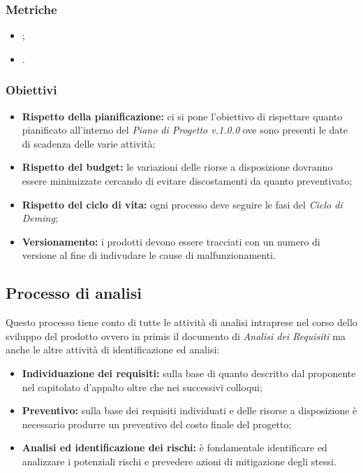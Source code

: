 \subsubsection{Metriche}

\begin{itemize}
    \item {};
    \item {}.
\end{itemize}

\subsubsection{Obiettivi}
\begin{itemize}
    \item \textbf{Rispetto della pianificazione:} ci si pone l'obiettivo di rispettare quanto pianificato all'interno del \textit{Piano di Progetto v.1.0.0} 
    ove sono presenti le date di scadenza delle varie attività;
    \item \textbf{Rispetto del budget:} le variazioni delle riorse a disposizione dovranno essere minimizzate cercando di evitare discostamenti da quanto preventivato;
    \item \textbf{Rispetto del ciclo di vita:} ogni processo deve seguire le fasi del \textit{Ciclo di Deming};
    \item \textbf{Versionamento:} i prodotti devono essere tracciati con un numero di versione al fine di indivudare le cause di malfunzionamenti.
\end{itemize}


\subsection{Processo di analisi}
Questo processo tiene conto di tutte le attività di analisi intraprese nel corso dello sviluppo del prodotto ovvero in primis il documento di \textit{Analisi dei Requisiti}
ma anche le altre attività di identificazione ed analisi:

\begin{itemize}
    \item  \textbf{Individuazione dei requisiti:} sulla base di quanto descritto dal proponente nel capitolato d'appalto oltre che nei successivi colloqui;
    \item \textbf{Preventivo:} sulla base dei requisiti individuati e delle risorse a disposizione è necessario produrre un preventivo del costo finale del progetto;
    \item \textbf{Analisi ed identificazione dei rischi:} è fondamentale identificare ed analizzare i potenziali rischi e prevedere azioni di mitigazione degli stessi.
\end{itemize}

